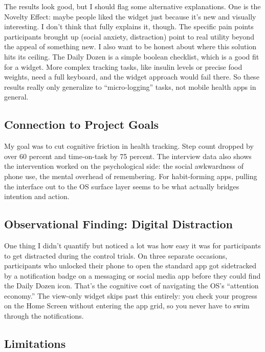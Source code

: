 \documentclass[10pt,twocolumn]{article}
\begin{document}
The results look good, but I should flag some alternative explanations. One is the Novelty Effect: maybe people liked the widget just because it's new and visually interesting. I don't think that fully explains it, though. The specific pain points participants brought up (social anxiety, distraction) point to real utility beyond the appeal of something new. I also want to be honest about where this solution hits its ceiling. The Daily Dozen is a simple boolean checklist, which is a good fit for a widget.\cite{GregerHowNotToDie} More complex tracking tasks, like insulin levels or precise food weights, need a full keyboard, and the widget approach would fail there. So these results really only generalize to ``micro-logging'' tasks, not mobile health apps in general.

\subsection{Connection to Project Goals}

My goal was to cut cognitive friction in health tracking. Step count dropped by over 60 percent and time-on-task by 75 percent. The interview data also shows the intervention worked on the psychological side: the social awkwardness of phone use, the mental overhead of remembering. For habit-forming apps, pulling the interface out to the OS surface layer seems to be what actually bridges intention and action.

\subsection{Observational Finding: Digital Distraction}

One thing I didn't quantify but noticed a lot was how easy it was for participants to get distracted during the control trials. On three separate occasions, participants who unlocked their phone to open the standard app got sidetracked by a notification badge on a messaging or social media app before they could find the Daily Dozen icon. That's the cognitive cost of navigating the OS's ``attention economy.''\cite{HayesSirensCall} The view-only widget skips past this entirely: you check your progress on the Home Screen without entering the app grid, so you never have to swim through the notifications.

\subsection{Limitations}
\end{document}
